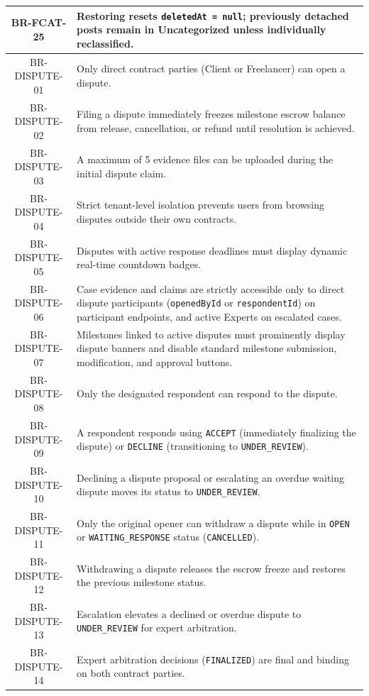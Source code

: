 \begin{longtable}{|c|p{12cm}|}
    BR-FCAT-25 & Restoring resets \texttt{deletedAt = null}; previously detached posts remain in Uncategorized unless individually reclassified. \\ \hline
    BR-DISPUTE-01 & Only direct contract parties (Client or Freelancer) can open a dispute. \\ \hline
    BR-DISPUTE-02 & Filing a dispute immediately freezes milestone escrow balance from release, cancellation, or refund until resolution is achieved. \\ \hline
    BR-DISPUTE-03 & A maximum of 5 evidence files can be uploaded during the initial dispute claim. \\ \hline
    BR-DISPUTE-04 & Strict tenant-level isolation prevents users from browsing disputes outside their own contracts. \\ \hline
    BR-DISPUTE-05 & Disputes with active response deadlines must display dynamic real-time countdown badges. \\ \hline
    BR-DISPUTE-06 & Case evidence and claims are strictly accessible only to direct dispute participants (\texttt{openedById} or \texttt{respondentId}) on participant endpoints, and active Experts on escalated cases. \\ \hline
    BR-DISPUTE-07 & Milestones linked to active disputes must prominently display dispute banners and disable standard milestone submission, modification, and approval buttons. \\ \hline
    BR-DISPUTE-08 & Only the designated respondent can respond to the dispute. \\ \hline
    BR-DISPUTE-09 & A respondent responds using \texttt{ACCEPT} (immediately finalizing the dispute) or \texttt{DECLINE} (transitioning to \texttt{UNDER\_REVIEW}). \\ \hline
    BR-DISPUTE-10 & Declining a dispute proposal or escalating an overdue waiting dispute moves its status to \texttt{UNDER\_REVIEW}. \\ \hline
    BR-DISPUTE-11 & Only the original opener can withdraw a dispute while in \texttt{OPEN} or \texttt{WAITING\_RESPONSE} status (\texttt{CANCELLED}). \\ \hline
    BR-DISPUTE-12 & Withdrawing a dispute releases the escrow freeze and restores the previous milestone status. \\ \hline
    BR-DISPUTE-13 & Escalation elevates a declined or overdue dispute to \texttt{UNDER\_REVIEW} for expert arbitration. \\ \hline
    BR-DISPUTE-14 & Expert arbitration decisions (\texttt{FINALIZED}) are final and binding on both contract parties. \\ \hline

\end{longtable}

